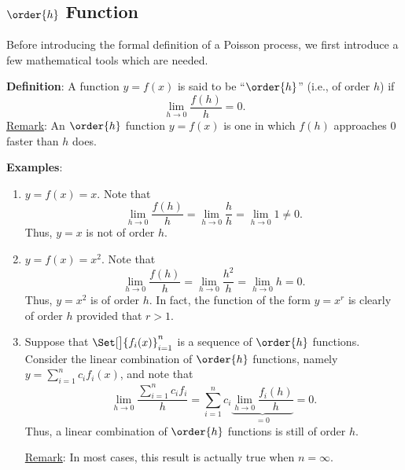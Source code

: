 \subsection*{$\order{h}$ Function}
Before introducing the formal definition of a Poisson process, we first introduce a few mathematical tools which are needed.
\begin{Regular}
    \textbf{Definition}: A function $ y=f(x) $ is said to be ``$ \order{h} $'' (i.e., of order $ h $) if
    \[ \lim\limits_{{h} \to {0}}\frac{f(h)}{h}=0. \]
    \tcblower{}
    \underline{Remark}: An $ \order{h} $ function $ y=f(x) $ is one in which $ f(h) $ approaches $ 0 $ faster than $ h $ does.
\end{Regular}
\begin{Example}
    \textbf{Examples}:
    \begin{enumerate}[(1)]
        \item $ y=f(x)=x $. Note that
              \[ \lim\limits_{{h} \to {0}}\frac{f(h)}{h}=\lim\limits_{{h} \to {0}}\frac{h}{h}=\lim\limits_{{h} \to {0}}1\ne 0. \]
              Thus, $ y=x $ is not of order $ h $.
        \item $ y=f(x)=x^2 $. Note that
              \[ \lim\limits_{{h} \to {0}}\frac{f(h)}{h}=\lim\limits_{{h} \to {0}}\frac{h^2}{h}=\lim\limits_{{h} \to {0}}h=0. \]
              Thus, $ y=x^2 $ is of order $ h $. In fact, the function of the form $ y=x^r $ is clearly of order $ h $ provided that $ r>1 $.
        \item Suppose that $ \Set[\big]{f_i(x)}_{i=1}^n $ is a sequence of $ \order{h} $ functions. Consider the linear combination of $ \order{h} $
              functions, namely $ y=\sum_{i=1}^{n}c_i f_i(x) $, and note that
              \[ \lim\limits_{{h} \to {0}}\frac{\sum_{i=1}^{n}c_i f_i}{h}=\sum_{i=1}^{n}c_i \underbrace{\lim\limits_{{h} \to {0}}\frac{f_i(h)}{h}}_{=0}=0. \]
              Thus, a linear combination of $ \order{h} $ functions is still of order $ h $.

              \underline{Remark}: In most cases, this result is actually true when $ n=\infty $.
    \end{enumerate}
\end{Example}
